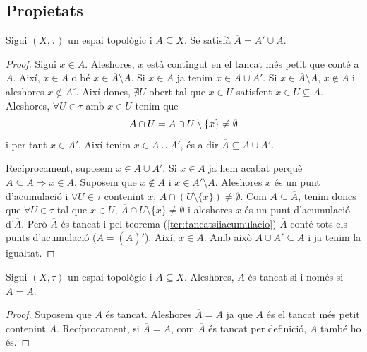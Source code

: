 \documentclass[../main.tex]{subfiles}
\begin{document}
\subsection{Propietats}

\begin{ter}
\label{ter:clausuraigualaadherenciaunioconjunt} Sigui $(X,\tau)$ un espai topològic i $A\subseteq X$. Se satisfà $\overline{A} = A'\cup A$.
\end{ter}
\begin{proof}
Sigui $x\in \overline{A}$. Aleshores, $x$ està contingut en el tancat més petit que conté a $A$. Així, $x\in A$ o bé $x\in \overline{A}\setminus A$. Si $x\in A$ ja tenim $x\in A\cup A'$. Si $x\in\overline{A}\setminus A$, $x\not\in A$ i aleshores $x\not\in A^\circ$. Així doncs, $\nexists U$ obert tal que $x\in U$ satisfent $x\in U\subseteq A$. Aleshores, $\forall U\in\tau$ amb $x\in U$ tenim que
\begin{equation}
    \notag
    A\cap U = A\cap U\setminus\{x\} \not=\emptyset
\end{equation}
i per tant $x\in A'$. Així tenim $x\in A\cup A'$, és a dir $\overline{A}\subseteq A\cup A'$.

Recíprocament, suposem $x\in A\cup A'$. Si $x\in A$ ja hem acabat perquè $A\subseteq \overline{A}\Rightarrow x\in \overline{A}$. Suposem que $x\not\in A$ i $x\in A'\setminus A$. Aleshores $x$ és un punt d'acumulació i $\forall U\in\tau$ contenint $x$, $A\cap (U\setminus\{x\})\not=\emptyset$. Com $A\subseteq \overline{A}$, tenim doncs que $\forall U\in\tau$ tal que $x\in U$, $\overline{A}\cap U\setminus\{x\}\not=\emptyset$ i aleshores $x$ és un punt d'acumulació d'$\overline{A}$. Però $\overline{A}$ és tancat i pel teorema (\ref{ter:tancatsiiacumulacio}) $\overline{A}$ conté tots els punts d'acumulació ($\overline{A} = (\overline{A})'$). Així, $x\in \overline{A}$. Amb això $A\cup A'\subseteq\overline{A}$ i ja tenim la igualtat.
\end{proof}

\begin{ter}
\label{ter:tancatsiiclausura} Sigui $(X,\tau)$ un espai topològic i $A\subseteq X$. Aleshores, $A$ és tancat si i només si $\overline{A} = A$.
\end{ter}
\begin{proof}
Suposem que $A$ és tancat. Aleshores $\overline{A}=A$ ja que $A$ és el tancat més petit contenint $A$. Recíprocament, si $\overline{A} = A$, com $\overline{A}$ és tancat per definició, $A$ també ho és.
\end{proof}
\end{document}
